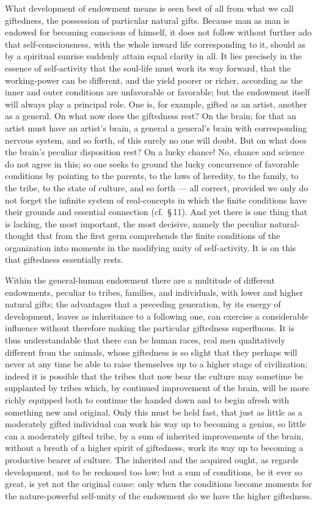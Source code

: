 \documentclass[12pt]{book}
\begin{document}
What development of endowment means is seen best of all from what we call giftedness, the
possession of particular natural gifts. Because man as man is endowed for becoming conscious
of himself, it does not follow without further ado that self-consciousness, with the whole
inward life corresponding to it, should as by a spiritual sunrise suddenly attain equal
clarity in all. It lies precisely in the essence of self-activity that the soul-life must
work its way forward, that the working-power can be different, and the yield poorer or richer,
according as the inner and outer conditions are unfavorable or favorable; but the endowment
itself will always play a principal role. One is, for example, gifted as an artist, another as
a general. On what now does the giftedness rest? On the brain; for that an artist must have an
artist's brain, a general a general's brain with corresponding nervous system, and so forth,
of this surely no one will doubt. But on what does the brain's peculiar disposition rest? On a
lucky chance! No, chance and science do not agree in this; so one seeks to ground the lucky
concurrence of favorable conditions by pointing to the parents, to the laws of heredity, to
the family, to the tribe, to the state of culture, and so forth --- all correct, provided we
only do not forget the infinite system of real-concepts in which the finite conditions have
their grounds and essential connection (cf.\ \S\,11). And yet there is one thing that is
lacking, the most important, the most decisive, namely the peculiar natural-thought that from
the first germ comprehends the finite conditions of the organization into moments in the
modifying unity of self-activity. It is on this that giftedness essentially rests.

Within the general-human endowment there are a multitude of different endowments, peculiar to
tribes, families, and individuals, with lower and higher natural gifts; the advantages that a
preceding generation, by its energy of development, leaves as inheritance to a following one,
can exercise a considerable influence without therefore making the particular giftedness
superfluous. It is thus understandable that there can be human races, real men qualitatively
different from the animals, whose giftedness is so slight that they perhaps will never at any
time be able to raise themselves up to a higher stage of civilization; indeed it is possible
that the tribes that now bear the culture may sometime be supplanted by tribes which, by
continued improvement of the brain, will be more richly equipped both to continue the handed
down and to begin afresh with something new and original. Only this must be held fast, that
just as little as a moderately gifted individual can work his way up to becoming a genius, so
little can a moderately gifted tribe, by a sum of inherited improvements of the brain, without
a breath of a higher spirit of giftedness, work its way up to becoming a productive bearer of
culture. The inherited and the acquired ought, as regards development, not to be reckoned too
low; but a sum of conditions, be it ever so great, is yet not the original cause: only when
the conditions become moments for the nature-powerful self-unity of the endowment do we have
the higher giftedness.
\end{document}
